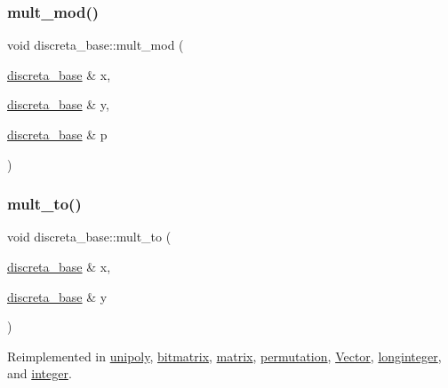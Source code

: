 \mbox{\label{classdiscreta__base_a01f00cf6c9f4a8d6209636de98e05c30}} 
\subsubsection{\texorpdfstring{mult\+\_\+mod()}{mult\_mod()}}
{\footnotesize\ttfamily void discreta\+\_\+base\+::mult\+\_\+mod (\begin{DoxyParamCaption}\item[{\mbox{\hyperlink{classdiscreta__base}{discreta\+\_\+base}} \&}]{x,  }\item[{\mbox{\hyperlink{classdiscreta__base}{discreta\+\_\+base}} \&}]{y,  }\item[{\mbox{\hyperlink{classdiscreta__base}{discreta\+\_\+base}} \&}]{p }\end{DoxyParamCaption})}

\mbox{\label{classdiscreta__base_a54d5c16c016769e3365639721c06591e}} 
\subsubsection{\texorpdfstring{mult\+\_\+to()}{mult\_to()}}
{\footnotesize\ttfamily void discreta\+\_\+base\+::mult\+\_\+to (\begin{DoxyParamCaption}\item[{\mbox{\hyperlink{classdiscreta__base}{discreta\+\_\+base}} \&}]{x,  }\item[{\mbox{\hyperlink{classdiscreta__base}{discreta\+\_\+base}} \&}]{y }\end{DoxyParamCaption})\hspace{0.3cm}{\ttfamily [virtual]}}



Reimplemented in \mbox{\hyperlink{classunipoly_a95bf7f347a5630f0d3f9737ffe22a341}{unipoly}}, \mbox{\hyperlink{classbitmatrix_af7dba8c0de2128e6aa413b70bcc1f78f}{bitmatrix}}, \mbox{\hyperlink{classmatrix_abde18a5fb21ce4d884dceedb286ba899}{matrix}}, \mbox{\hyperlink{classpermutation_abbd320f211ed730261c31fecd5a567bb}{permutation}}, \mbox{\hyperlink{class_vector_a77dd4ded54124a6f928c411dc0960a73}{Vector}}, \mbox{\hyperlink{classlonginteger_a1afdab43a82be7dfd40ff41da28735d2}{longinteger}}, and \mbox{\hyperlink{classinteger_a7f4f072c0d9c6b15660d80e81496dffc}{integer}}.

